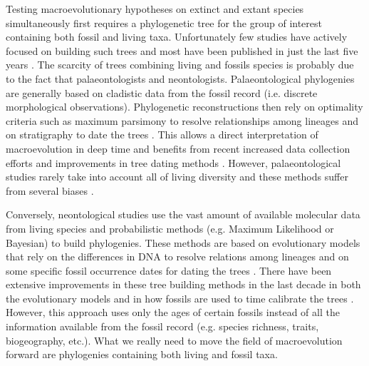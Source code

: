
Testing macroevolutionary hypotheses on extinct and extant species simultaneously first requires a phylogenetic tree for the group of interest containing both fossil and living taxa.
Unfortunately few studies have actively focused on building such trees and most have been published in just the last five years \citep[e.g.][]{ronquista2012,Slater2012MEE,Wood01032013,beckancient2014}.
The scarcity of trees combining living and fossils species is probably due to the fact that palaeontologists and neontologists.
Palaeontological phylogenies are generally based on cladistic data from the fossil record (i.e. discrete morphological observations).
Phylogenetic reconstructions then rely on optimality criteria such as maximum parsimony \citep{Hennig1966,felsenstein2004} to resolve relationships among lineages and on stratigraphy to date the trees \citep{GoloboffTNT}.
This allows a direct interpretation of macroevolution in deep time and benefits from recent increased data collection efforts \citep[e.g. 4541 characters in][introducing the term ``phenomics'']{O'Leary08022013} and improvements in tree dating methods \citep[e.g. the \textit{cal3} method from][]{Bapst2014}.
However, palaeontological studies rarely take into account all of living diversity \citep[e.g. only 38 out of 351 living primates are included with 119 fossils in][]{ni2013oldest} and these methods suffer from several biases \citep[e.g. evolution is not parsimonious;][]{wrightbayesian2014}.

Conversely, neontological studies use the vast amount of available molecular data from living species and probabilistic methods (e.g. Maximum Likelihood or Bayesian) to build phylogenies.
These methods are based on evolutionary models that rely on the differences in DNA to resolve relations among lineages and on some specific fossil occurrence dates for dating the trees \citep[i.e. the molecular clock;][]{zuckerkandl1965}.
There have been extensive improvements in these tree building methods in the last decade in both the evolutionary models \citep[e.g.][]{bapsta2013,stadlerdating2013,heaththe2013} and in how fossils are used to time calibrate the trees \citep{Donoghue2007424,Parham01032012}.
However, this approach uses only the ages of certain fossils instead of all the information available from the fossil record (e.g. species richness, traits, biogeography, etc.).
What we really need to move the field of macroevolution forward are phylogenies containing both living and fossil taxa.

